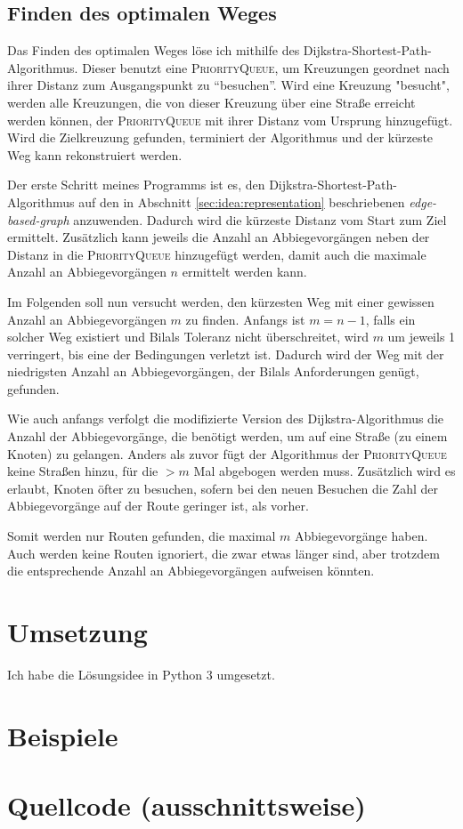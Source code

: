 \documentclass[a4paper,10pt,ngerman]{scrartcl}
\begin{document}
\subsection{Finden des optimalen Weges}
Das Finden des optimalen Weges löse ich mithilfe des Dijkstra-Shortest-Path-Algorithmus.
Dieser benutzt eine \textsc{PriorityQueue}, um Kreuzungen geordnet nach ihrer Distanz zum Ausgangspunkt zu \enquote{besuchen}.
Wird eine Kreuzung "besucht", werden alle Kreuzungen, die von dieser Kreuzung über eine Straße erreicht werden können, der \textsc{PriorityQueue} mit ihrer Distanz vom Ursprung hinzugefügt.
Wird die Zielkreuzung gefunden, terminiert der Algorithmus und der kürzeste Weg kann rekonstruiert werden.

Der erste Schritt meines Programms ist es, den Dijkstra-Shortest-Path-Algorithmus auf den in Abschnitt \ref{sec:idea:representation} beschriebenen \textit{edge-based-graph} anzuwenden.
Dadurch wird die kürzeste Distanz vom Start zum Ziel ermittelt.
Zusätzlich kann jeweils die Anzahl an Abbiegevorgängen neben der Distanz in die \textsc{PriorityQueue} hinzugefügt werden, damit auch die maximale Anzahl an Abbiegevorgängen $n$ ermittelt werden kann.

Im Folgenden soll nun versucht werden, den kürzesten Weg mit einer gewissen Anzahl an Abbiegevorgängen $m$ zu finden.
Anfangs ist $m = n - 1$, falls ein solcher Weg existiert und Bilals Toleranz nicht überschreitet, wird $m$ um jeweils 1 verringert, bis eine der Bedingungen verletzt ist.
Dadurch wird der Weg mit der niedrigsten Anzahl an Abbiegevorgängen, der Bilals Anforderungen genügt, gefunden.

Wie auch anfangs verfolgt die modifizierte Version des Dijkstra-Algorithmus die Anzahl der Abbiegevorgänge, die benötigt werden, um auf eine Straße (zu einem Knoten) zu gelangen.
Anders als zuvor fügt der Algorithmus der \textsc{PriorityQueue} keine Straßen hinzu, für die $>m$ Mal abgebogen werden muss.
Zusätzlich wird es erlaubt, Knoten öfter zu besuchen, sofern bei den neuen Besuchen die Zahl der Abbiegevorgänge auf der Route geringer ist, als vorher.

Somit werden nur Routen gefunden, die maximal $m$ Abbiegevorgänge haben.
Auch werden keine Routen ignoriert, die zwar etwas länger sind, aber trotzdem die entsprechende Anzahl an Abbiegevorgängen aufweisen könnten.

\section{Umsetzung}

Ich habe die Lösungsidee in Python 3 umgesetzt.

\section{Beispiele}

\section{Quellcode (ausschnittsweise)}

\listoftodos


\printbibliography
\end{document}
